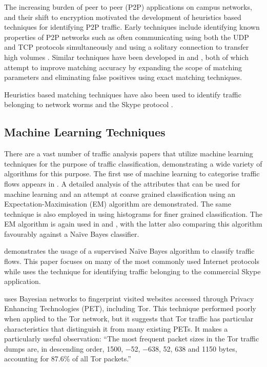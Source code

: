 \documentclass{conference}
\begin{document}
The increasing burden of peer to peer (P2P) applications on campus networks, and their shift to encryption motivated the development of heuristics based techniques for identifying P2P traffic. Early techniques include identifying known properties of P2P networks such as often communicating using both the UDP and TCP protocols simultaneously and using a solitary connection to transfer high volumes \parencite{Karagiannis:2004p6400}. Similar techniques have been developed in \parencite{Perenyi:2006p6325} and \parencite{John:2008p1376}, both of which attempt to improve matching accuracy by expanding the scope of matching parameters and eliminating false positives using exact matching techniques.

Heuristics based matching techniques have also been used to identify traffic belonging to network worms \parencite{Lazarevic:2003p6450} and the Skype protocol \parencite{Ehlert:2006p2396}.

\subsection{Machine Learning Techniques}

There are a vast number of traffic analysis papers that utilize machine learning techniques for the purpose of traffic classification, demonstrating a wide variety of algorithms for this purpose. The first use of machine learning to categorise traffic flows appears in \textcite{McGregor:2004p3826}. A detailed analysis of the attributes that can be used for machine learning and an attempt at coarse grained classification using an Expectation-Maximisation (EM) algorithm are demonstrated. The same technique is also employed in \textcite{Soule:2004p3817} using histograms for finer grained classification. The EM algorithm is again used in \textcite{Zander:2005p6212} and \textcite{Erman:2006p3825}, with the latter also comparing this algorithm favourably against a Na\"ive Bayes classifier.

\textcite{Moore:2005p3827} demonstrates the usage of a supervised Na\"ive Bayes algorithm to classify traffic flows. This paper focuses on many of the most commonly used Internet protocols while \textcite{Bonfiglio:2007p6453} uses the technique for identifying traffic belonging to the commercial Skype application.

\textcite{Herrmann:2009p1189} uses Bayesian networks to fingerprint visited websites accessed through Privacy Enhancing Technologies (PET), including Tor. This technique performed poorly when applied to the Tor network, but it suggests that Tor traffic has particular characteristics that distinguish it from many existing PETs. It makes a particularly useful observation: ``The most frequent packet sizes in the Tor traffic dumps are, in descending order, 1500, −52, −638, 52, 638 and 1150 bytes, accounting for 87.6\% of all Tor packets.''
\end{document}
